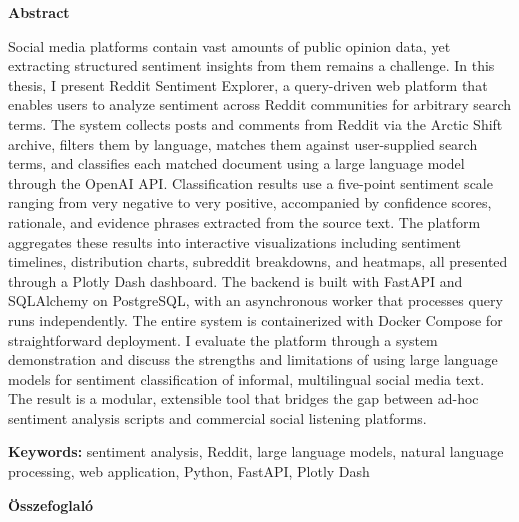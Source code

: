 \begin{center}
  {\fontsize{14}{18} \textbf{Abstract}}
\end{center}

Social media platforms contain vast amounts of public opinion data, yet extracting structured sentiment insights from them remains a challenge. In this thesis, I present Reddit Sentiment Explorer, a query-driven web platform that enables users to analyze sentiment across Reddit communities for arbitrary search terms. The system collects posts and comments from Reddit via the Arctic Shift archive, filters them by language, matches them against user-supplied search terms, and classifies each matched document using a large language model through the OpenAI API. Classification results use a five-point sentiment scale ranging from very negative to very positive, accompanied by confidence scores, rationale, and evidence phrases extracted from the source text. The platform aggregates these results into interactive visualizations including sentiment timelines, distribution charts, subreddit breakdowns, and heatmaps, all presented through a Plotly Dash dashboard. The backend is built with FastAPI and SQLAlchemy on PostgreSQL, with an asynchronous worker that processes query runs independently. The entire system is containerized with Docker Compose for straightforward deployment. I evaluate the platform through a system demonstration and discuss the strengths and limitations of using large language models for sentiment classification of informal, multilingual social media text. The result is a modular, extensible tool that bridges the gap between ad-hoc sentiment analysis scripts and commercial social listening platforms.

\vspace{1em}

\textbf{Keywords:} sentiment analysis, Reddit, large language models, natural language processing, web application, Python, FastAPI, Plotly Dash

\vspace{2em}

\begin{center}
  {\fontsize{14}{16} \textbf{Összefoglaló}}
\end{center}

